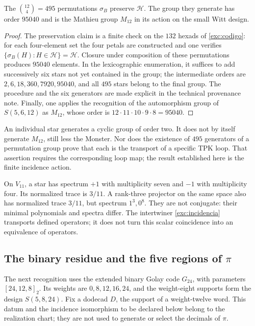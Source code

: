 \begin{proposition}
\label{exc:m12}
The $\binom{12}4=495$ permutations $\sigma_B$ preserve $\mathcal H$.
The group they generate has order $95040$ and is the Mathieu group
$M_{12}$ in its action on the small Witt design.
\end{proposition}

\begin{proof}
The preservation claim is a finite check on the
$132$ hexads of \eqref{exc:codigo}: for each four-element set the
four petals are constructed and one verifies
$\{\sigma_B(H):H\in\mathcal H\}=\mathcal H$.
Closure under composition of these permutations produces $95040$
elements. In the lexicographic enumeration, it suffices to add successively
six stars not yet contained in the group; the intermediate orders
are $2,6,18,360,7920,95040$, and all $495$ stars belong to the final
group. The procedure and the six generators are made explicit in
the technical provenance note. Finally, one applies the recognition
of the automorphism group of $S(5,6,12)$ as $M_{12}$, whose order is
$12\cdot11\cdot10\cdot9\cdot8=95040$.
\end{proof}

An individual star generates a cyclic group of order two. It does
not by itself generate $M_{12}$, still less the Monster. Nor does the
existence of $495$ generators of a permutation group prove that
each is the transport of a specific TPK loop. That assertion
requires the corresponding loop map; the result established here
is the finite incidence action.

\begin{remark}
On $V_{11}$, a star has spectrum $+1$ with multiplicity seven
and $-1$ with multiplicity four. Its normalized trace is $3/11$.
A rank-three projector on the same space also has normalized
trace $3/11$, but spectrum $1^3,0^8$. They are not conjugate: their
minimal polynomials and spectra differ. The intertwiner
\eqref{exc:incidencia} transports defined operators; it does not turn
this scalar coincidence into an equivalence of operators.
\end{remark}

\subsection{The binary residue and the five regions of \texorpdfstring{$\pi$}{pi}}
\label{exc:cinco-regiones}

The next recognition uses the extended binary Golay code
$G_{24}$, with parameters $[24,12,8]_2$. Its weights are
$0,8,12,16,24$, and the weight-eight supports form the design
$S(5,8,24)$. Fix a dodecad $D$, the support of a weight-twelve
word. This datum and the incidence isomorphism to be declared
below belong to the realization chart; they are not used to
generate or select the decimals of $\pi$.

